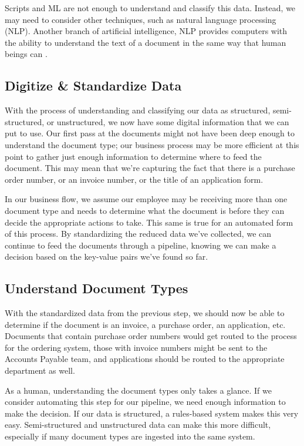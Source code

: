 \documentclass[conference]{IEEEtran}
\begin{document}
Scripts and ML are not enough to understand and classify this data. Instead, we may need to consider other techniques, such as natural language processing (NLP). Another branch of artificial intelligence, NLP provides computers with the ability to understand the text of a document in the same way that human beings can \cite{ibm:nlp}.

\subsection{Digitize \& Standardize Data}
With the process of understanding and classifying our data as structured, semi-structured, or unstructured, we now have some digital information that we can put to use. Our first pass at the documents might not have been deep enough to understand the document type; our business process may be more efficient at this point to gather just enough information to determine where to feed the document. This may mean that we're capturing the fact that there is a purchase order number, or an invoice number, or the title of an application form. 

In our business flow, we assume our employee may be receiving more than one document type and needs to determine what the document is before they can decide the appropriate actions to take. This same is true for an automated form of this process. By standardizing the reduced data we've collected, we can continue to feed the documents through a pipeline, knowing we can make a decision based on the key-value pairs we've found so far.

\subsection{Understand Document Types}
With the standardized data from the previous step, we should now be able to determine if the document is an invoice, a purchase order, an application, etc. Documents that contain purchase order numbers would get routed to the process for the ordering system, those with invoice numbers might be sent to the Accounts Payable team, and applications should be routed to the appropriate department as well.

As a human, understanding the document types only takes a glance. If we consider automating this step for our pipeline, we need enough information to make the decision. If our data is structured, a rules-based system makes this very easy. Semi-structured and unstructured data can make this more difficult, especially if many document types are ingested into the same system. 
\end{document}
